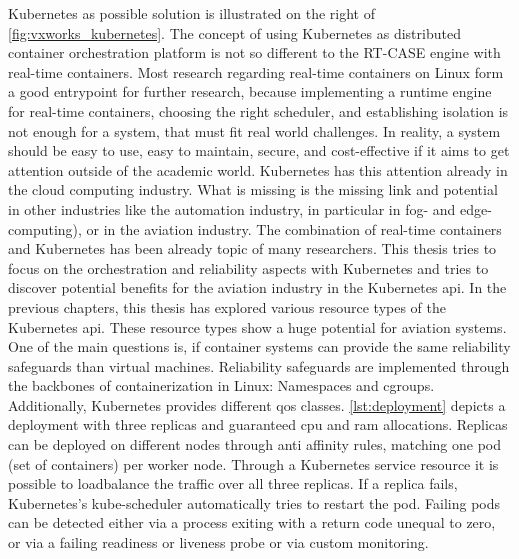 \documentclass[titlepage]{report}
\begin{document}
Kubernetes as possible solution is illustrated on the right of \autoref{fig:vxworks_kubernetes}. The concept of using Kubernetes as distributed container orchestration platform is not so different to the RT-CASE engine with real-time containers.
Most research regarding real-time containers on Linux form a good entrypoint for further research, because implementing a runtime engine for real-time containers, choosing the right scheduler, and establishing isolation is not enough
for a system, that must fit real world challenges. In reality, a system should be easy to use, easy to maintain, secure, and cost-effective if it aims to get attention outside of the academic world. Kubernetes has this attention already
in the cloud computing industry. What is missing is the missing link and potential in other industries like the automation industry, in particular in fog- and edge-computing), or in the aviation industry. The combination of real-time containers and Kubernetes
has been already topic of many researchers\cite{frankel2021real}\cite{struhar2021react}\cite{fiori2022rt}\cite{koziolek2021dynamic}. This thesis tries to focus
on the orchestration and reliability aspects with Kubernetes and tries to discover potential benefits for the aviation industry in the Kubernetes \gls{api}. In the previous chapters, this thesis has explored various resource types
of the Kubernetes \gls{api}. These resource types show a huge potential for aviation systems. One of the main questions is, if container systems can provide the same reliability safeguards than virtual machines. Reliability safeguards
are implemented through the backbones of containerization in Linux: Namespaces and \glspl{cgroup}. Additionally, Kubernetes provides different \gls{qos} classes. \autoref{lst:deployment} depicts a deployment with three replicas and guaranteed
\gls{cpu} and \gls{ram} allocations. Replicas can be deployed on different nodes through anti affinity rules, matching one pod (set of containers) per worker node. Through a Kubernetes service resource it is possible to loadbalance
the traffic over all three replicas. If a replica fails, Kubernetes's kube-scheduler automatically tries to restart the pod. Failing pods can be detected either via a process exiting with a return code unequal to zero, or via a failing
readiness or liveness probe or via custom monitoring.
\end{document}
